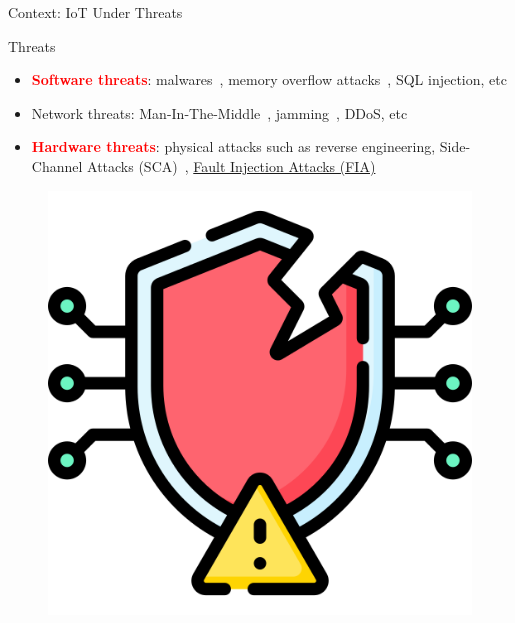 \begin{frame}{Context: IoT Under Threats}
    \begin{minipage}[c]{0.7\textwidth}
        \begin{block}{Threats}
            \begin{itemize}
                [square]
                \justifying
                \item \textbf{\textcolor{red}{Software threats}}: malwares~\cite{FIMI-23-access}, memory overflow attacks~\cite{CWCBW-00-discex}, SQL injection, etc
                \item Network threats: Man-In-The-Middle~\cite{CDL-16-commsurtuto}, jamming~\cite{PZ-22-commsurtuto}, DDoS, etc
                \item \textbf{\textcolor{red}{Hardware threats}}: physical attacks such as reverse engineering, Side-Channel Attacks (SCA)~\cite{DM-21-appiot}, \underline{Fault Injection Attacks (FIA)}~\cite{BCNTW-06-procieee}
            \end{itemize}
        \end{block}
    \end{minipage}\hfill%
    \begin{minipage}[c]{0.3\textwidth}
        \begin{figure}
            \centering
            \includegraphics[width=.5\textwidth]{src/1_introduction/img/threats.png}
        \end{figure}
    \end{minipage}
\end{frame}
